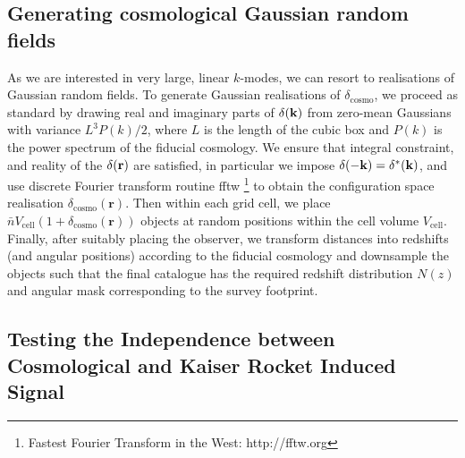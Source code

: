 \documentclass[a4paper,11pt]{article}
\begin{document}
\subsection{Generating cosmological Gaussian random fields}
As we are interested in very large, linear $k$-modes, we can  resort to realisations of Gaussian random fields. To generate Gaussian realisations of $\delta_\mathrm{cosmo}$, we proceed as standard by drawing real and imaginary parts of $\delta({\bf k})$ from zero-mean Gaussians with variance $L^3P(k)/2$, where $L$ is the length of the cubic box and $P(k)$ is the power spectrum of the fiducial cosmology.
We ensure that integral constraint, and  reality of the $\delta({\bf r})$  are satisfied, in particular we impose $\delta(-{\bf k})=\delta^*({\bf k})$, and use  discrete Fourier transform routine fftw \cite{FFTW05}\footnote{Fastest Fourier Transform in the West: http://fftw.org} to obtain the configuration space realisation $\delta_\mathrm{cosmo}(\mathbf{r})$.
Then within each grid cell, we place $\bar n V_\mathrm{cell}(1 + \delta_\mathrm{cosmo}(\mathbf{r}))$ objects at random positions within the cell volume $V_\mathrm{cell}$.
Finally, after suitably placing the observer, we transform distances into  redshifts (and angular positions) according to the fiducial cosmology and  downsample the  objects such that the final catalogue has the  required redshift distribution $N(z)$ and angular mask corresponding to  the survey footprint.

\subsection{Testing the Independence between Cosmological and Kaiser Rocket Induced Signal}
\label{sec:crosstest}
\end{document}
